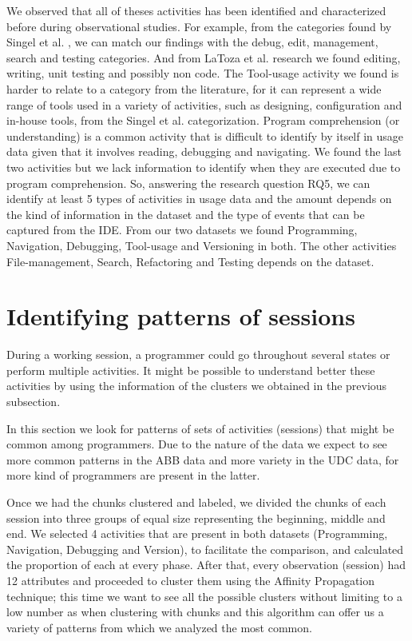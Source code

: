 \begin{changedforreviewerlong}
We observed that all of theses activities has been identified and characterized before during observational studies. For example, from the categories found by Singel et al. \cite{SLV10}, we can match our findings with the debug, edit, management, search and testing categories. And from LaToza et al. \cite{LVD06} research we found editing, writing, unit testing and possibly non code. The Tool-usage activity we found is harder to relate to a category from the literature, for it can represent a wide range of tools used in a variety of activities, such as designing, configuration and in-house tools, from the Singel et al. categorization. Program comprehension (or understanding) is a common activity that is difficult to identify by itself in usage data given that it involves reading, debugging and navigating. We found the last two activities but we lack information to identify when they are executed due to program comprehension. So, answering the research question RQ5, we can identify at least 5 types of activities in usage data and the amount depends on the kind of information in the dataset and the type of events that can be captured from the IDE. From our two datasets we found Programming, Navigation, Debugging, Tool-usage and Versioning in both. The other activities File-management, Search, Refactoring and Testing depends on the dataset.
\end{changedforreviewerlong}

\section{Identifying patterns of sessions}
During a working session, a programmer could go throughout several states or perform multiple activities. It might be possible to understand better these activities by using the information of the clusters we obtained in the previous subsection. 

In this section we look for patterns of sets of activities (sessions) that might be common among programmers. Due to the nature of the data we expect to see more common patterns in the ABB data and more variety in the UDC data, for more kind of programmers are present in the latter.

Once we had the chunks clustered and labeled, we divided the chunks of each session into three groups of equal size representing the beginning, middle and end. We selected 4 activities that are present in both datasets (Programming, Navigation, Debugging and Version), to facilitate the comparison, and calculated the proportion of each at every phase. After that, every observation (session) had 12 attributes and proceeded to cluster them using the Affinity Propagation technique; this time we want to see all the possible clusters without limiting to a low number as when clustering with chunks and this algorithm can offer us a variety of patterns from which we analyzed the most common.


